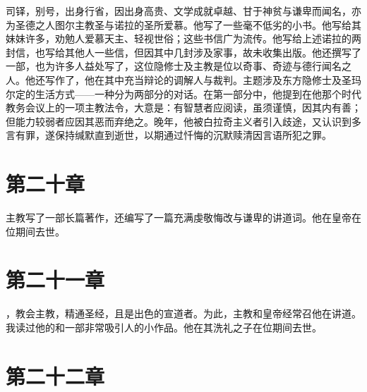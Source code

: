 司铎，别号，出身行省，因出身高贵、文学成就卓越、甘于神贫与谦卑而闻名，亦为圣德之人图尔主教圣与诺拉的圣所爱慕。他写了一些毫不低劣的小书。他写给其妹妹许多，劝勉人爱慕天主、轻视世俗；这些书信广为流传。他写给上述诺拉的两封信，也写给其他人一些信，但因其中几封涉及家事，故未收集出版。他还撰写了一部，也为许多人益处写了，这位隐修士及主教是位以奇事、奇迹与德行闻名之人。他还写作了，他在其中充当辩论的调解人与裁判。主题涉及东方隐修士及圣玛尔定的生活方式——一种分为两部分的对话。在第一部分中，他提到在他那个时代教务会议上的一项主教法令，大意是：有智慧者应阅读，虽须谨慎，因其内有善；但能力较弱者应因其恶而弃绝之。晚年，他被白拉奇主义者引入歧途，又认识到多言有罪，遂保持缄默直到逝世，以期通过忏悔的沉默赎清因言语所犯之罪。\par


\section{第二十章}

主教写了一部长篇著作，还编写了一篇充满虔敬悔改与谦卑的讲道词。他在皇帝在位期间去世。\par


\section{第二十一章}

，教会主教，精通圣经，且是出色的宣道者。为此，主教和皇帝经常召他在讲道。我读过他的和一部非常吸引人的小作品。他在其洗礼之子在位期间去世。\par


\section{第二十二章}

